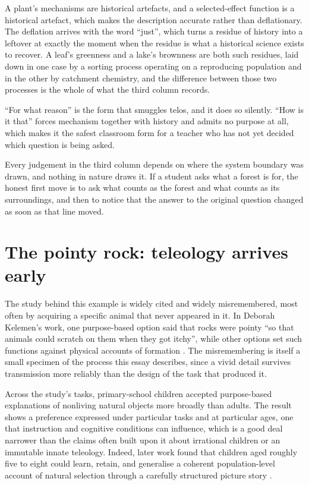A plant's mechanisms are historical artefacts, and a selected-effect function is a historical artefact, which makes the description accurate rather than deflationary. The deflation arrives with the word ``just'', which turns a residue of history into a leftover at exactly the moment when the residue is what a historical science exists to recover. A leaf's greenness and a lake's brownness are both such residues, laid down in one case by a sorting process operating on a reproducing population and in the other by catchment chemistry, and the difference between those two processes is the whole of what the third column records.

\begin{compressed}
``For what reason'' is the form that smuggles telos, and it does so silently. ``How is it that'' forces mechanism together with history and admits no purpose at all, which makes it the safest classroom form for a teacher who has not yet decided which question is being asked.
\end{compressed}

\begin{openquestion}
Every judgement in the third column depends on where the system boundary was drawn, and nothing in nature draws it. If a student asks what a forest is for, the honest first move is to ask what counts as the forest and what counts as its surroundings, and then to notice that the answer to the original question changed as soon as that line moved.
\end{openquestion}

\section{The pointy rock: teleology arrives early}

The study behind this example is widely cited and widely misremembered, most often by acquiring a specific animal that never appeared in it. In Deborah Kelemen's work, one purpose-based option said that rocks were pointy ``so that animals could scratch on them when they got itchy'', while other options set such functions against physical accounts of formation \citep{kelemen1999}. The misremembering is itself a small specimen of the process this essay describes, since a vivid detail survives transmission more reliably than the design of the task that produced it.

Across the study's tasks, primary-school children accepted purpose-based explanations of nonliving natural objects more broadly than adults. The result shows a preference expressed under particular tasks and at particular ages, one that instruction and cognitive conditions can influence, which is a good deal narrower than the claims often built upon it about irrational children or an immutable innate teleology. Indeed, later work found that children aged roughly five to eight could learn, retain, and generalise a coherent population-level account of natural selection through a carefully structured picture story \citep{kelemen2014}.

